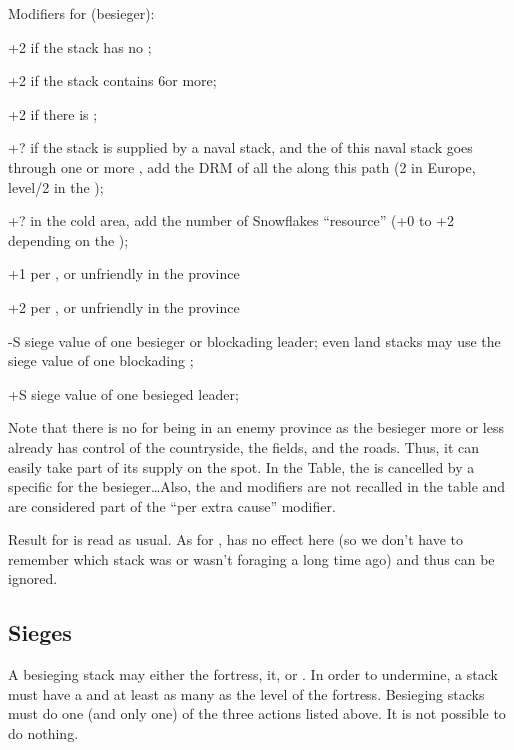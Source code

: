 Modifiers for  (besieger):
\begin{modlist}
\item[+2] if the stack has no \LoS;
\item[+2] if the stack contains 6\LD or more;
\item[+2] if there is ;
\item[+?] if the stack is supplied by a naval stack, and the \LoS of this
  naval stack goes through one or more \StraitFort, add the DRM of all the
  \StraitFort along this path (2 in Europe, level/2 in the \ROTW);
\item[+?] in the \ROTW cold area, add the number of Snowflakes ``resource''
  (+0 to +2 depending on the \Area);
\item[+1] per \PILLAGE\facemoins, \REVOLT\facemoins or unfriendly
  \REBELLION\facemoins in the province
\item[+2] per \PILLAGE\faceplus, \REVOLT\faceplus or unfriendly
  \REBELLION\faceplus in the province
\item[-S] siege value of one besieger or blockading leader; even land stacks
  may use the siege value of one blockading \LeaderA;
\item[+S] siege value of one besieged leader;
\end{modlist}

Note that there is no  for being in an enemy province as the
besieger more or less already has control of the countryside, the fields,
and the roads. Thus, it can easily take part of its supply on the spot. In the
Table, the  is cancelled by a specific  for the
besieger\ldots Also, the  and 
modifiers are not recalled in the table and are considered part of the ``per
extra cause'' modifier.

Result for  is read as usual. As for ,  has no effect here (so we don't have to
remember which stack was or wasn't foraging a long time ago) and thus can be
ignored.

\subsection{Sieges}
A besieging stack may either  the fortress, 
it, or . In order to undermine, a stack must have a \LoS and
at least as many \LD as the level of the fortress. Besieging stacks must do
one (and only one) of the three actions listed above. It is not possible to do
nothing.

